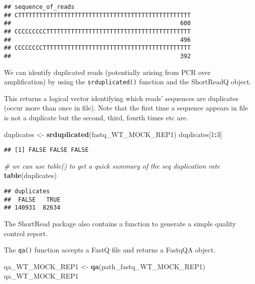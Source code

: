 \documentclass[
]{book}
\newenvironment{Shaded}{\begin{snugshade}}{\end{snugshade}}
\newcommand{\CommentTok}[1]{\textcolor[rgb]{0.56,0.35,0.01}{\textit{#1}}}
\newcommand{\DecValTok}[1]{\textcolor[rgb]{0.00,0.00,0.81}{#1}}
\newcommand{\FunctionTok}[1]{\textcolor[rgb]{0.13,0.29,0.53}{\textbf{#1}}}
\newcommand{\NormalTok}[1]{#1}
\newcommand{\OtherTok}[1]{\textcolor[rgb]{0.56,0.35,0.01}{#1}}
\newcommand{\SpecialCharTok}[1]{\textcolor[rgb]{0.81,0.36,0.00}{\textbf{#1}}}
\begin{document}
\begin{verbatim}
## sequence_of_reads
## CTTTTTTTTTTTTTTTTTTTTTTTTTTTTTTTTTTTTTTTTTTTTTTTTT 
##                                                600 
## CCCCCCCCCTTTTTTTTTTTTTTTTTTTTTTTTTTTTTTTTTTTTTTTTT 
##                                                496 
## CCCCCCCCTTTTTTTTTTTTTTTTTTTTTTTTTTTTTTTTTTTTTTTTTT 
##                                                392
\end{verbatim}

We can identify duplicated reads (potentially arising from PCR over amplification) by using the \texttt{srduplicated()} function and the ShortReadQ object.

This returns a logical vector identifying which reads' sequences are duplicates (occur more than once in file). Note that the first time a sequence appears in file is not a duplicate but the second, third, fourth times etc are.

\begin{Shaded}
\begin{Highlighting}[]
\NormalTok{duplicates }\OtherTok{\textless{}{-}} \FunctionTok{srduplicated}\NormalTok{(fastq\_WT\_MOCK\_REP1)}
\NormalTok{duplicates[}\DecValTok{1}\SpecialCharTok{:}\DecValTok{3}\NormalTok{]}
\end{Highlighting}
\end{Shaded}

\begin{verbatim}
## [1] FALSE FALSE FALSE
\end{verbatim}

\begin{Shaded}
\begin{Highlighting}[]
\CommentTok{\# we can use table() to get a quick summary of the seq duplication rate}
\FunctionTok{table}\NormalTok{(duplicates)}
\end{Highlighting}
\end{Shaded}

\begin{verbatim}
## duplicates
##  FALSE   TRUE 
## 140931  82634
\end{verbatim}

The ShortRead package also contains a function to generate a simple quality control report.

The \texttt{qa()} function accepts a FastQ file and returns a FastqQA object.

\begin{Shaded}
\begin{Highlighting}[]
\NormalTok{qa\_WT\_MOCK\_REP1 }\OtherTok{\textless{}{-}} \FunctionTok{qa}\NormalTok{(path\_fastq\_WT\_MOCK\_REP1)}
\NormalTok{qa\_WT\_MOCK\_REP1}
\end{Highlighting}
\end{Shaded}
\end{document}
